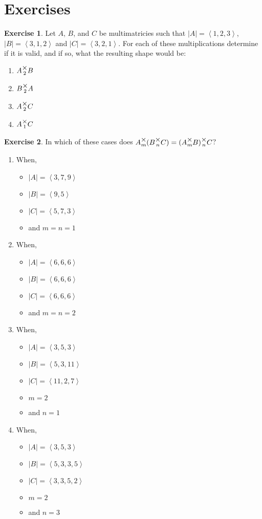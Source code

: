 \documentclass[12pt]{book}
\theoremstyle{definition}
\newtheorem{exercise}{Exercise}[chapter]
\theoremstyle{plain}
\theoremstyle{ppart}
\theoremstyle{case}
\theoremstyle{solution}
\newcommand{\mmult}[1]{\text{\raisebox{1ex}{$\underset{#1}{\times}$}}}
\begin{document}
\section{Exercises}

\begin{exercise}
Let $A$, $B$, and $C$ be multimatricies such that $|A| = \left<1,2,3\right>$,
$|B| = \left<3,1,2\right>$ and $|C| = \left<3,2,1\right>$. For each of these
multiplications determine if it is valid, and if so, what the resulting
shape would be:
\begin{enumerate}
\item $A \mmult{2} B$
\item $B \mmult{2} A$
\item $A \mmult{2} C$
\item $A \mmult{1} C$
\end{enumerate}
\end{exercise}

\begin{exercise}
In which of these cases does $A \mmult{m} (B \mmult{n} C) = (A \mmult{m} B) \mmult{n} C$?
\begin{enumerate}
\item When,
	\begin{itemize}
		\item $|A| = \left<3, 7, 9\right>$
		\item $|B| = \left<9, 5\right>$
		\item $|C| = \left<5, 7, 3\right>$
		\item and $m = n = 1$
	\end{itemize}
\item When,
	\begin{itemize}
		\item $|A| = \left<6, 6, 6\right>$
		\item $|B| = \left<6, 6, 6\right>$
		\item $|C| = \left<6, 6, 6\right>$
		\item and $m = n = 2$
	\end{itemize}
\item When,
	\begin{itemize}
		\item $|A| = \left<3, 5, 3\right>$
		\item $|B| = \left<5, 3, 11\right>$
		\item $|C| = \left<11, 2, 7\right>$
		\item $m = 2$
		\item and $n = 1$
	\end{itemize}
\item When,
	\begin{itemize}
		\item $|A| = \left<3, 5, 3\right>$
		\item $|B| = \left<5, 3, 3, 5\right>$
		\item $|C| = \left<3, 3, 5, 2\right>$
		\item $m = 2$
		\item and $n = 3$
	\end{itemize}
\end{enumerate}
\end{exercise}
\end{document}
